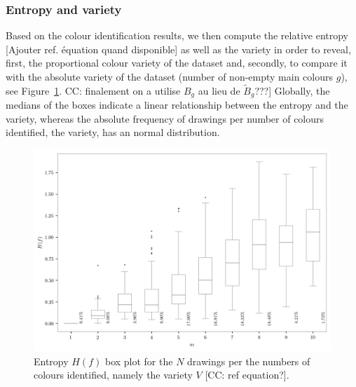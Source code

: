 \documentclass[11pt,a4paper]{article}
\begin{document}
\subsubsection{Entropy and variety}
Based on the colour identification results, we then compute the relative entropy {\color{red}[Ajouter ref. \'equation quand disponible]} as well as the variety in order to reveal, first, the proportional colour variety of the dataset and, secondly, to compare it with the absolute variety of the dataset (number of non-empty main colours $g$), see Figure~\ref{fig:boxplotvariety}. {\color{red} CC: finalement on a utilise $B_{g}$ au lieu de $\tilde{B}_g$???]}
Globally, the medians of the boxes indicate a linear  relationship between the entropy and the variety, whereas the absolute frequency of drawings per number of colours identified, the variety, has an normal distribution.

\begin{figure}[h!]
	\centering
	\includegraphics[width=\linewidth]{figures/colors-boxplot.png}
	\caption{Entropy $H(f)$ box plot for the $N$ drawings per the numbers of colours identified, namely the variety $V$ {\color{red}[CC: ref equation?]}.}
	\label{fig:boxplotvariety}
\end{figure}
\end{document}
